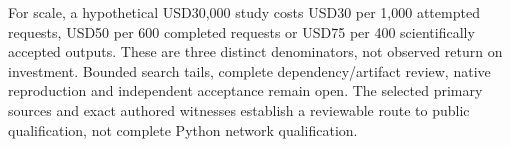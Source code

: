 For scale, a hypothetical USD30,000 study costs USD30 per 1,000 attempted requests, USD50 per 600 completed requests or USD75 per 400 scientifically accepted outputs. These are three distinct denominators, not observed return on investment. Bounded search tails, complete dependency/artifact review, native reproduction and independent acceptance remain open. The selected primary sources and exact authored witnesses establish a reviewable route to public qualification, not complete Python network qualification.\citep{exec25_pnet_choice}
